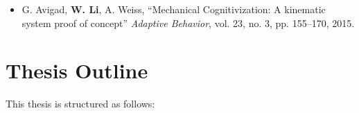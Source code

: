 \begin{itemize}
%
\item G. Avigad, \textbf{W. Li}, A. Weiss, ``Mechanical Cognitivization: A kinematic system proof of concept'' \textit{Adaptive Behavior}, vol. 23, no. 3, pp. 155--170, 2015.
%
\end{itemize}

\section{Thesis Outline}

This thesis is structured as follows:

